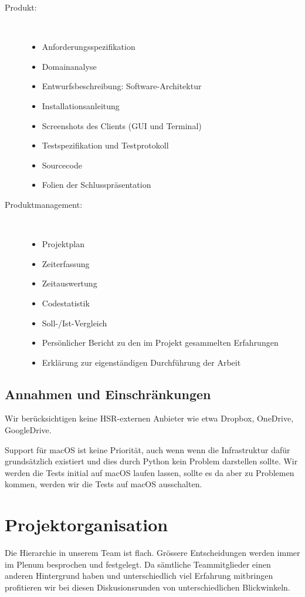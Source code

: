 \documentclass[a4paper]{article}
\begin{document}
\begin{description}
	\item[Produkt:] \strut \\[-1em]
	\begin{itemize}
		\item Anforderungsspezifikation
		\item Domainanalyse
		\item Entwurfsbeschreibung: Software-Architektur
		\item Installationsanleitung
		\item Screenshots des Clients (GUI und Terminal)
		\item Testspezifikation und Testprotokoll
		\item Sourcecode
		\item Folien der Schlusspräsentation
	\end{itemize}
	\item[Produktmanagement:] \strut \\[-1em]
	\begin{itemize}
		\item Projektplan
		\item Zeiterfassung
		\item Zeitauswertung
		\item Codestatistik
		\item Soll-/Ist-Vergleich
		\item Persönlicher Bericht zu den im Projekt gesammelten Erfahrungen
		\item Erklärung zur eigenständigen Durchführung der Arbeit
	\end{itemize}
\end{description}

\subsection{Annahmen und Einschränkungen}
Wir berücksichtigen keine HSR-externen Anbieter wie etwa Dropbox, OneDrive, GoogleDrive.

Support für macOS ist keine Priorität, auch wenn wenn die Infrastruktur dafür
grundsätzlich existiert und dies durch Python kein Problem darstellen sollte.
Wir werden die Tests initial auf macOS laufen lassen, sollte es da aber zu
Problemen kommen, werden wir die Tests auf macOS ausschalten.

\section{Projektorganisation}
Die Hierarchie in unserem Team ist flach.
Grössere Entscheidungen werden immer im Plenum besprochen und festgelegt.
Da sämtliche Teammitglieder einen anderen Hintergrund haben und unterschiedlich viel Erfahrung mitbringen profitieren wir bei diesen Diskusionsrunden von unterschiedlichen Blickwinkeln.
\end{document}
